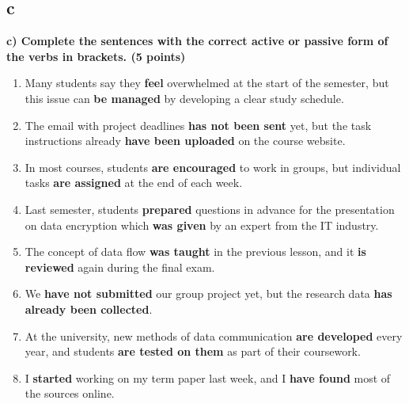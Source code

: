 \documentclass[a4paper,12pt]{article}
\begin{document}
\vspace{1cm}

\subsection{c}
\textbf{c) Complete the sentences with the correct active or passive form of the verbs in brackets. (5 points)}

\begin{enumerate}
    \item Many students say they \textbf{feel} overwhelmed at the start of the semester, but this issue can \textbf{be managed} by developing a clear study schedule.
    
    \item The email with project deadlines \textbf{has not been sent} yet, but the task instructions already \textbf{have been uploaded} on the course website.
    
    \item In most courses, students \textbf{are encouraged} to work in groups, but individual tasks \textbf{are assigned} at the end of each week.
    
    \item Last semester, students \textbf{prepared} questions in advance for the presentation on data encryption which \textbf{was given} by an expert from the IT industry.
    
    \item The concept of data flow \textbf{was taught} in the previous lesson, and it \textbf{is reviewed} again during the final exam.
    
    \item We \textbf{have not submitted} our group project yet, but the research data \textbf{has already been collected}.
    
    \item At the university, new methods of data communication \textbf{are developed} every year, and students \textbf{are tested on them} as part of their coursework.
    
    \item I \textbf{started} working on my term paper last week, and I \textbf{have found} most of the sources online.
\end{enumerate}
\end{document}
